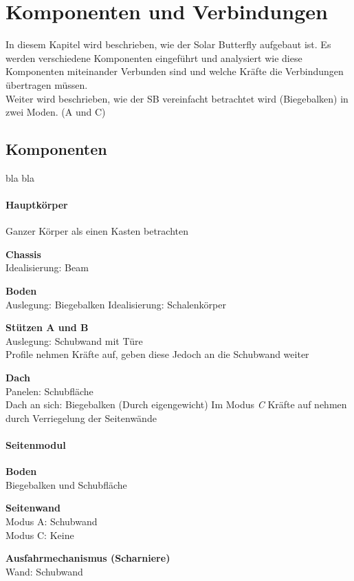 \section{Komponenten und Verbindungen}
In diesem Kapitel wird beschrieben, wie der Solar Butterfly aufgebaut ist. Es werden verschiedene Komponenten eingeführt und analysiert wie diese Komponenten miteinander Verbunden sind und welche Kräfte die Verbindungen übertragen müssen.\\
Weiter wird beschrieben, wie der SB vereinfacht betrachtet wird (Biegebalken) in zwei Moden. (A und C)

\subsection{Komponenten}
bla bla

\paragraph{Hauptkörper}
Ganzer Körper als einen Kasten betrachten
\begin{description}
  \item \textbf{Chassis}\\
  Idealisierung: Beam
  \item \textbf{Boden}\\
  Auslegung: Biegebalken
  Idealisierung: Schalenkörper\\
  \item \textbf{Stützen A und B}\\
  Auslegung: Schubwand mit Türe\\
  Profile nehmen Kräfte auf, geben diese Jedoch an die Schubwand weiter\\
  \item \textbf{Dach}\\
  Panelen: Schubfläche\\
  Dach an sich: Biegebalken (Durch eigengewicht)
  Im Modus \emph{C} Kräfte auf nehmen durch Verriegelung der Seitenwände
\end{description}

\paragraph{Seitenmodul}
\begin{description}
  \item \textbf{Boden}\\
  Biegebalken und Schubfläche
  \item \textbf{Seitenwand}\\
  Modus A: Schubwand\\
  Modus C: Keine
  \item \textbf{Ausfahrmechanismus (Scharniere)}\\
  Wand: Schubwand
  \item \textbf{}\\
  \item \textbf{}\\
\end{description}
